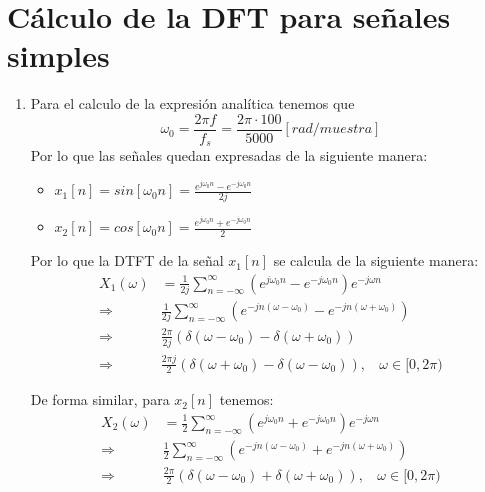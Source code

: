 \documentclass[letterpaper,onecolumn,10pt,journal,final]{IEEEtran}
\begin{document}
\section{Cálculo de la DFT para señales simples}
\begin{enumerate}[1)]
    \item %
    
Para el calculo de la expresión analítica tenemos que
\begin{equation*}
    \omega _0 = \frac{2 \pi f}{f_s} = \frac{2 \pi \cdot 100}{5000} [rad/muestra]
\end{equation*}
Por lo que las señales quedan expresadas de la siguiente manera:
\begin{itemize}
    \item $x_1 [n] = sin[ \omega _0 n] = \frac{e ^{j \omega _0 n}-e ^{-j \omega _0 n} }{2j}$
    \item $x_2 [n] = cos[ \omega _0 n] = \frac{e ^{j \omega _0 n}+ e ^{-j \omega _0 n} }{2}$
\end{itemize}
Por lo que la DTFT de la señal $x_1[n]$ se calcula de la siguiente manera:
\begin{equation*}
    \begin{split}
    X_1(\omega ) &= \frac{1}{2j} \sum _{n=- \infty } ^{ \infty} \left( e ^{j \omega _0 n}-e ^{-j \omega _0 n} \right)  e^{-j \omega n} \\
    \Rightarrow & \frac{1}{2j} \sum _{n=- \infty } ^{ \infty} \left( e ^{ - j n( \omega - \omega _0)}-e ^{- j n( \omega + \omega _0)} \right) \\
    \Rightarrow & \frac{2 \pi }{2 j} \left( \delta (\omega -  \omega _0) - \delta (\omega + \omega _0 )  \right)\\
    \Rightarrow & \frac{2 \pi j }{2} \left( \delta (\omega +  \omega _0) - \delta (\omega - \omega _0 )  \right), ~~~~ \omega \in [0,2 \pi)
    \end{split}
\end{equation*}

De forma similar, para $x_2[n]$ tenemos:
\begin{equation*}
    \begin{split}
    X_2(\omega ) &= \frac{1}{2} \sum _{n=- \infty } ^{ \infty} \left( e ^{j \omega _0 n}+e ^{-j \omega _0 n} \right)  e^{-j \omega n} \\
    \Rightarrow & \frac{1}{2} \sum _{n=- \infty } ^{ \infty} \left( e ^{ - j n( \omega - \omega _0)}+e ^{- j n( \omega + \omega _0)} \right) \\
    \Rightarrow & \frac{2 \pi }{2} \left( \delta (\omega -  \omega _0) + \delta (\omega + \omega _0 )  \right), ~~~~ \omega \in [0,2 \pi)
    \end{split}
\end{equation*}


\end{enumerate}
\end{document}
